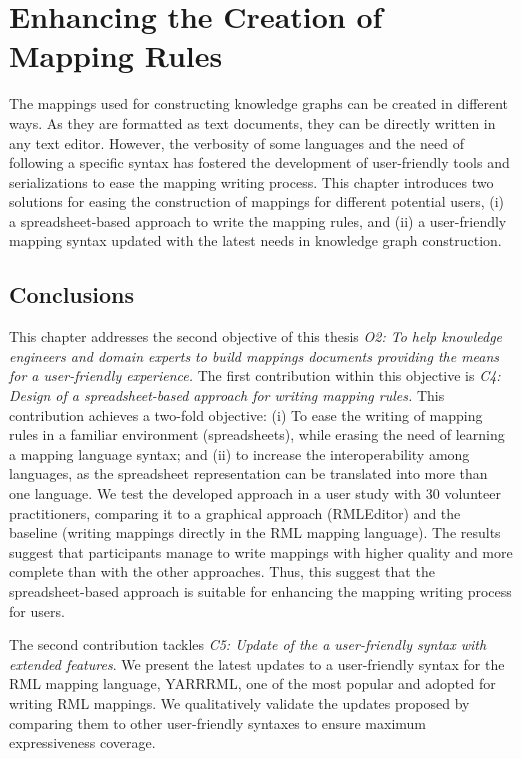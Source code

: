 
\chapter{Enhancing the Creation of Mapping Rules}
\label{chapter:creation}

The mappings used for constructing knowledge graphs can be created in different ways. As they are formatted as text documents, they can be directly written in any text editor. However, the verbosity of some languages and the need of following a specific syntax has fostered the development of user-friendly tools and serializations to ease the mapping writing process. This chapter introduces two solutions for easing the construction of mappings for different potential users, (i) a spreadsheet-based approach to write the mapping rules, and (ii) a user-friendly mapping syntax updated with the latest needs in knowledge graph construction.





\section{Conclusions}

This chapter addresses the second objective of this thesis \textit{O2: To help knowledge engineers and domain experts to build mappings documents providing the means for a user-friendly experience.}
The first contribution within this objective is \textit{C4: Design of a spreadsheet-based approach for writing mapping rules.} This contribution achieves a two-fold objective: (i) To ease the writing of mapping rules in a familiar environment (spreadsheets), while erasing the need of learning a mapping language syntax; and (ii) to increase the interoperability among languages, as the spreadsheet representation can be translated into more than one language. We test the developed approach in a user study with 30 volunteer practitioners, comparing it to a graphical approach (RMLEditor) and the baseline (writing mappings directly in the RML mapping language). The results suggest that participants manage to write mappings with higher quality and more complete than with the other approaches. Thus, this suggest that the spreadsheet-based approach is suitable for enhancing the mapping writing process for users. 

The second contribution tackles \textit{C5: Update of the a user-friendly syntax with extended features}. 
We present the latest updates to a user-friendly syntax for the RML mapping language, YARRRML, one of the most popular and adopted for writing RML mappings. 
We qualitatively validate the updates proposed by comparing them to other user-friendly syntaxes to ensure maximum expressiveness coverage. 


